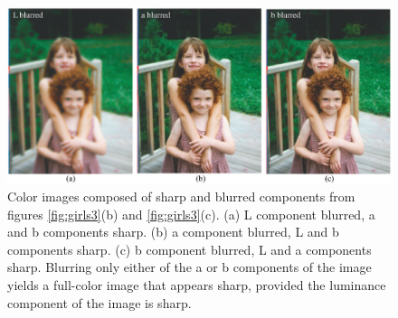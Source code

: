 \begin{figure}
\centerline{
\includegraphics[width=1.0\linewidth]{figures/color/blur_lab_girls.eps}
}
\caption{Color images composed of sharp and blurred components from figures \ref{fig:girls3}(b) and \ref{fig:girls3}(c).  (a) L component blurred, a and b components sharp.  (b)  a component blurred, L and b components sharp. 
(c) b component blurred, L and a components sharp. Blurring only either of the a or b components of the image yields a full-color image that appears sharp, provided the luminance component of the image is sharp.}
\label{fig:girls4}
\end{figure}





